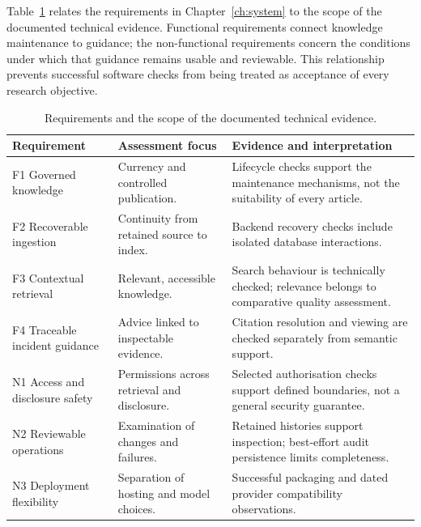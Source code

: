 Table~\ref{tab:evaluation-status} relates the requirements in Chapter~\ref{ch:system} to the scope of the documented technical evidence. Functional requirements connect knowledge maintenance to guidance; the non-functional requirements concern the conditions under which that guidance remains usable and reviewable. This relationship prevents successful software checks from being treated as acceptance of every research objective.

\begin{table}[htbp]
\centering\small
\caption{Requirements and the scope of the documented technical evidence.}
\label{tab:evaluation-status}
\begin{tabularx}{\textwidth}{@{}>{\raggedright\arraybackslash}p{}>{\raggedright\arraybackslash}p{}>{\raggedright\arraybackslash}X@{}}
\toprule
\rowcolor{TableNavy}
\color{white}\bfseries Requirement & \color{white}\bfseries Assessment focus & \color{white}\bfseries Evidence and interpretation \\
\midrule
\rowcolor{TableStripe}
F1 Governed knowledge & Currency and controlled publication. & Lifecycle checks support the maintenance mechanisms, not the suitability of every article. \\
F2 Recoverable ingestion & Continuity from retained source to index. & Backend recovery checks include isolated database interactions. \\
\rowcolor{TableStripe}
F3 Contextual retrieval & Relevant, accessible knowledge. & Search behaviour is technically checked; relevance belongs to comparative quality assessment. \\
F4 Traceable incident guidance & Advice linked to inspectable evidence. & Citation resolution and viewing are checked separately from semantic support. \\
\rowcolor{TableStripe}
N1 Access and disclosure safety & Permissions across retrieval and disclosure. & Selected authorisation checks support defined boundaries, not a general security guarantee. \\
N2 Reviewable operations & Examination of changes and failures. & Retained histories support inspection; best-effort audit persistence limits completeness. \\
\rowcolor{TableStripe}
N3 Deployment flexibility & Separation of hosting and model choices. & Successful packaging and dated provider compatibility observations. \\
\bottomrule
\end{tabularx}
\end{table}

